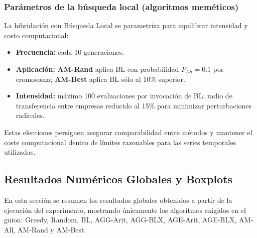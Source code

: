 \subsubsection*{Parámetros de la búsqueda local (algoritmos meméticos)}

La hibridación con Búsqueda Local se parametriza para equilibrar intensidad y costo computacional:

\begin{itemize}
    \item \textbf{Frecuencia:} cada 10 generaciones.
    \item \textbf{Aplicación:} \textbf{AM-Rand} aplica BL con probabilidad $P_{LS}=0.1$ por cromosoma; \textbf{AM-Best} aplica BL sólo al 10\% superior.
    \item \textbf{Intensidad:} máximo 100 evaluaciones por invocación de BL; radio de transferencia entre empresas reducido al 15\% para minimizar perturbaciones radicales.
\end{itemize}

Estas elecciones persiguen asegurar comparabilidad entre métodos y mantener el coste computacional dentro de límites razonables para las series temporales utilizadas.

\subsection{Resultados Numéricos Globales y Boxplots}

En esta sección se resumen los resultados globales obtenidos a partir de la ejecución del experimento, mostrando únicamente los algoritmos exigidos en el guion: Greedy, Random, BL, AGG-Arit, AGG-BLX, AGE-Arit, AGE-BLX, AM-All, AM-Rand y AM-Best.


